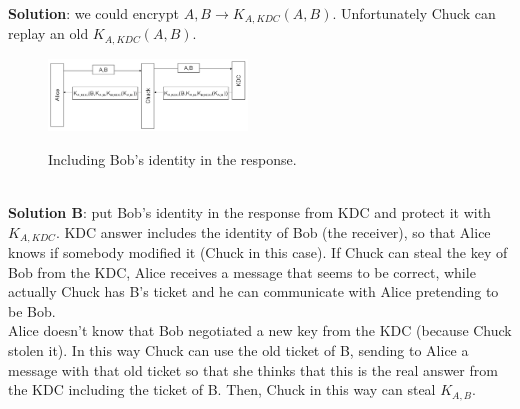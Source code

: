 \documentclass[10pt,a4paper]{article}
\begin{document}
\textbf{Solution}: we could encrypt $A,B \rightarrow K_{A,KDC}(A,B)$.
Unfortunately Chuck can replay an old $K_{A,KDC}(A,B)$.
\begin{figure}[h!]\hfill \includegraphics[width=150pt]{images/kdc3.png}\hspace*{\fill}
  \label{fig:kdc3}
  \caption{Including Bob's identity in the response.}
\end{figure} \\
\textbf{Solution B}: put Bob's identity in the response from KDC and protect it with $K_{A,KDC}$. 
KDC answer includes the identity of Bob (the receiver), so that Alice knows if somebody modified it (Chuck in this case). If Chuck can steal the key of Bob from the KDC, Alice receives a message that seems to be correct, while actually Chuck has B's ticket and he can communicate with Alice pretending to be Bob.\\ Alice doesn't know that Bob negotiated a new key from the KDC (because Chuck stolen it). In this way Chuck can use the old ticket of B, sending to Alice a message with that old ticket so that she thinks that this is the real answer from the KDC including the ticket of B. Then, Chuck in this way can steal $K_{A,B}$.
\end{document}

